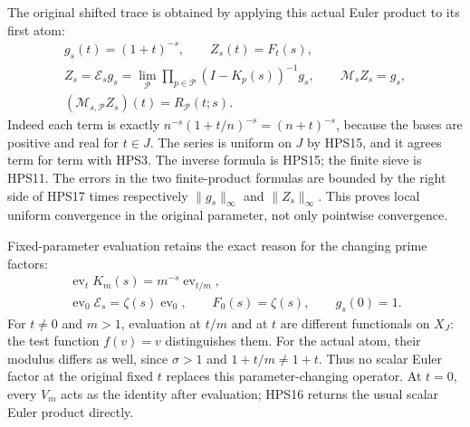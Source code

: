 The original shifted trace is obtained by applying
this actual Euler product to its first atom:
\begin{equation}\tag{HPS18}
\begin{gathered}
 g_s(t)=(1+t)^{-s},\qquad Z_s(t)=F_t(s),\\
 Z_s=\mathcal E_sg_s
     =\lim_{\mathcal P}
             \prod_{p\in\mathcal P}(I-K_p(s))^{-1}g_s,
 \qquad
 \mathcal M_sZ_s=g_s,\\
 (\mathcal M_{s,\mathcal P}Z_s)(t)
           =R_{\mathcal P}(t;s).
\end{gathered}
\end{equation}
Indeed each term is exactly
$n^{-s}(1+t/n)^{-s}=(n+t)^{-s}$, because the
bases are positive and real for $t\in J$.
The series is uniform on $J$ by HPS15,
and it agrees term for term with HPS3.
The inverse formula is HPS15; the finite
sieve is HPS11. The errors in the two
finite-product formulas are bounded by
the right side of HPS17 times respectively
$\|g_s\|_\infty$ and $\|Z_s\|_\infty$.
This proves local uniform convergence in the
original parameter, not only pointwise convergence.

Fixed-parameter evaluation retains the exact
reason for the changing prime factors:
\begin{equation}\tag{HPS19}
\begin{gathered}
 \operatorname{ev}_tK_m(s)
                =m^{-s}\operatorname{ev}_{t/m},\\
 \operatorname{ev}_0\mathcal E_s
                =\zeta(s)\operatorname{ev}_0,\qquad
 F_0(s)=\zeta(s),\qquad g_s(0)=1.
\end{gathered}
\end{equation}
For $t\ne0$ and $m>1$, evaluation at $t/m$
and at $t$ are different functionals on $X_J$:
the test function $f(v)=v$ distinguishes them.
For the actual atom, their modulus differs
as well, since $\sigma>1$ and
$1+t/m\ne1+t$.
Thus no scalar Euler factor at the original
fixed $t$ replaces this parameter-changing
operator. At $t=0$, every $V_m$ acts as the
identity after evaluation; HPS16 returns
the usual scalar Euler product directly.

